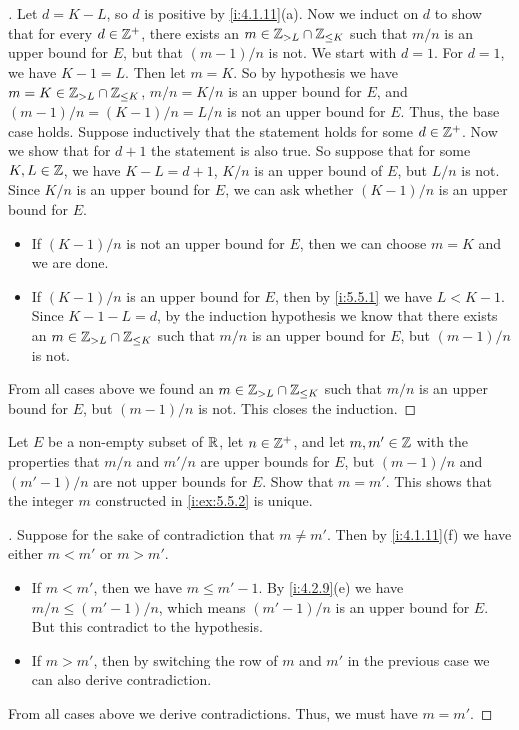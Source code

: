 \begin{proof}[]
  Let \(d = K - L\), so \(d\) is positive by \cref{i:4.1.11}(a).
  Now we induct on \(d\) to show that for every \(d \in \mathbb{Z}^+\), there exists an \(m \in \mathbb{Z}_{> L} \cap \mathbb{Z}_{\leq K}\) such that \(m / n\) is an upper bound for \(E\), but that \((m - 1) / n\) is not.
  We start with \(d = 1\).
  For \(d = 1\), we have \(K - 1 = L\).
  Then let \(m = K\).
  So by hypothesis we have \(m = K \in \mathbb{Z}_{> L} \cap \mathbb{Z}_{\leq K}\), \(m / n = K / n\) is an upper bound for \(E\), and \((m - 1) / n = (K - 1) / n = L / n\) is not an upper bound for \(E\).
  Thus, the base case holds.
  Suppose inductively that the statement holds for some \(d \in \mathbb{Z}^+\).
  Now we show that for \(d + 1\) the statement is also true.
  So suppose that for some \(K, L \in \mathbb{Z}\), we have \(K - L = d + 1\), \(K / n\) is an upper bound of \(E\), but \(L / n\) is not.
  Since \(K / n\) is an upper bound for \(E\), we can ask whether \((K - 1) / n\) is an upper bound for \(E\).
  \begin{itemize}
    \item If \((K - 1) / n\) is not an upper bound for \(E\), then we can choose \(m = K\) and we are done.
    \item If \((K - 1) / n\) is an upper bound for \(E\), then by \cref{i:5.5.1} we have \(L < K - 1\).
          Since \(K - 1 - L = d\), by the induction hypothesis we know that there exists an \(m \in \mathbb{Z}_{> L} \cap \mathbb{Z}_{\leq K}\) such that \(m / n\) is an upper bound for \(E\), but \((m - 1) / n\) is not.
  \end{itemize}
  From all cases above we found an \(m \in \mathbb{Z}_{> L} \cap \mathbb{Z}_{\leq K}\) such that \(m / n\) is an upper bound for \(E\), but \((m - 1) / n\) is not.
  This closes the induction.
\end{proof}

\begin{ex}\label{i:ex:5.5.3}
  Let \(E\) be a non-empty subset of \(\mathbb{R}\), let \(n \in \mathbb{Z}^+\), and let \(m, m' \in \mathbb{Z}\) with the properties that \(m / n\) and \(m' / n\) are upper bounds for \(E\), but \((m - 1) / n\) and \((m' - 1) / n\) are not upper bounds for \(E\).
  Show that \(m = m'\).
  This shows that the integer \(m\) constructed in \cref{i:ex:5.5.2} is unique.
\end{ex}

\begin{proof}[]
  Suppose for the sake of contradiction that \(m \neq m'\).
  Then by \cref{i:4.1.11}(f) we have either \(m < m'\) or \(m > m'\).
  \begin{itemize}
    \item If \(m < m'\), then we have \(m \leq m' - 1\).
          By \cref{i:4.2.9}(e) we have \(m / n \leq (m' - 1) / n\), which means \((m' - 1) / n\) is an upper bound for \(E\).
          But this contradict to the hypothesis.
    \item If \(m > m'\), then by switching the row of \(m\) and \(m'\) in the previous case we can also derive contradiction.
  \end{itemize}
  From all cases above we derive contradictions.
  Thus, we must have \(m = m'\).
\end{proof}

